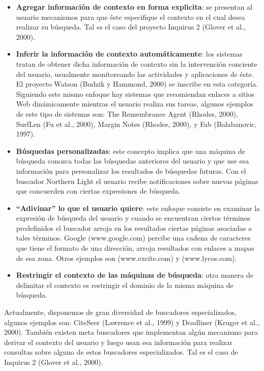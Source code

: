 \begin{itemize}

\item \textbf{Agregar información de contexto en forma explicita}: se presentan
al usuario
mecanismos para que éste especifique el contexto en el cual desea realizar su
búsqueda. Tal es el caso del proyecto Inquirus 2 (Glover et al., 2000).

\item \textbf{Inferir la información de contexto automáticamente}: los sistemas
tratan de obtener
dicha información de contexto sin la intervención conciente del usuario,
usualmente
monitoreando las actividades y aplicaciones de éste. El proyecto Watson (Budzik
y
Hammond, 2000) se inscribe en esta categoría. Siguiendo este mismo enfoque hay
sistemas que recomiendan enlaces a sitios Web dinámicamente mientras el usuario
realiza sus tareas, algunos ejemplos de este tipo de sistemas son: The
Remembrance
Agent (Rhodes, 2000), SurfLen (Fu et al., 2000), Margin Notes (Rhodes, 2000), y
Fab (Balabanovic, 1997).

\item \textbf{Búsquedas personalizadas}: este concepto implica que una máquina
de búsqueda
conozca todas las búsquedas anteriores del usuario y que use esa información
para
personalizar los resultados de búsquedas futuras. Con el buscador Northern Light
el
usuario recibe notificaciones sobre nuevas páginas que concuerden con ciertas
expresiones de búsqueda.

\item \textbf{“Adivinar” lo que el usuario quiere}: este enfoque consiste en
examinar la expresión
de búsqueda del usuario y cuando se encuentran ciertos términos predefinidos el
buscador arroja en los resultados ciertas páginas asociadas a tales términos.
Google
(www.google.com) percibe una cadena de caracteres que tiene el formato de una
dirección, arroja resultados con enlaces a mapas de esa zona. Otros ejemplos son
(www.excite.com) y (www.lycos.com).

\item \textbf{Restringir el contexto de las máquinas de búsqueda}: otra manera
de delimitar el
contexto es restringir el dominio de la misma máquina de búsqueda. 

\end{itemize}


Actualmente, disponemos de gran diversidad de buscadores especializados, algunos
ejemplos son:
CiteSeer (Lawrence et al., 1999) y Deadliner (Kruger et al., 2000). También existen meta buscadores que implementan algún mecanismo para derivar el contexto del usuario y luego usan esa información para realizar consultas sobre alguno de estos buscadores especializados. Tal es el caso de Inquirus 2 (Glover et al., 2000).

